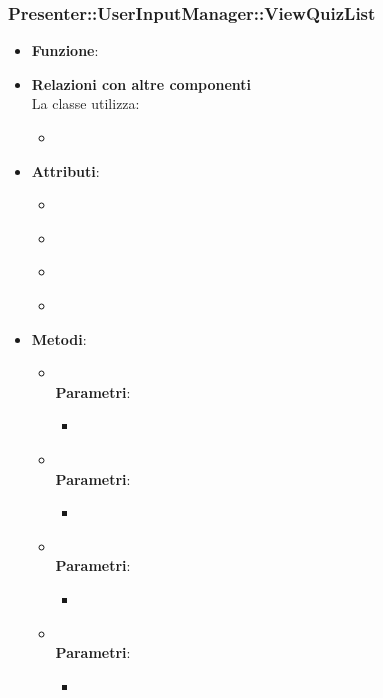 \subsubsection{Presenter::UserInputManager::ViewQuizList}\begin{itemize}
\item\textbf{Funzione}:
\item\textbf{Relazioni con altre componenti}\\
La classe utilizza:
	\begin{itemize}
		\item
	\end{itemize}
\item\textbf{Attributi}:
	\begin{itemize}
		\item\code{}\\
		\item\code{}\\
		\item\code{}\\
		\item\code{}\\
	\end{itemize}
\item\textbf{Metodi}:
	\begin{itemize}
		\item\code{}\\
		\textbf{Parametri}:
			\begin{itemize}
				\item\code{}\\
			\end{itemize}
		\item\code{}\\
		\textbf{Parametri}:
			\begin{itemize}
				\item\code{}\\
			\end{itemize}
		\item\code{}\\
		\textbf{Parametri}:
			\begin{itemize}
				\item\code{}\\
			\end{itemize}
		\item\code{}\\
		\textbf{Parametri}:
			\begin{itemize}
				\item\code{}\\
			\end{itemize}
	\end{itemize}
\end{itemize}


